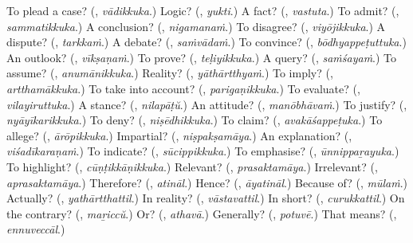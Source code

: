 \begin{tcolorbox}[breakable,colback=teal!4,colframe=teal!35!black,title={Before you move on}]
To plead a case? (\textbf{}, \emph{vādikkuka}.) Logic? (\textbf{}, \emph{yukti}.) A fact? (\textbf{}, \emph{vastuta}.) To admit? (\textbf{}, \emph{sammatikkuka}.) A conclusion? (\textbf{}, \emph{nigamanaṁ}.) To disagree? (\textbf{}, \emph{viyōjikkuka}.) A dispute? (\textbf{}, \emph{tarkkaṁ}.) A debate? (\textbf{}, \emph{saṁvādaṁ}.) To convince? (\textbf{}, \emph{bōdhyappeṭuttuka}.) An outlook? (\textbf{}, \emph{vīkṣaṇaṁ}.) To prove? (\textbf{}, \emph{teḷiyikkuka}.) A query? (\textbf{}, \emph{saṁśayaṁ}.) To assume? (\textbf{}, \emph{anumānikkuka}.) Reality? (\textbf{}, \emph{yāthārtthyaṁ}.) To imply? (\textbf{}, \emph{artthamākkuka}.) To take into account? (\textbf{}, \emph{parigaṇikkuka}.) To evaluate? (\textbf{}, \emph{vilayiruttuka}.) A stance? (\textbf{}, \emph{nilapāṭŭ}.) An attitude? (\textbf{}, \emph{manōbhāvaṁ}.) To justify? (\textbf{}, \emph{nyāyīkarikkuka}.) To deny? (\textbf{}, \emph{niṣēdhikkuka}.) To claim? (\textbf{}, \emph{avakāśappeṭuka}.) To allege? (\textbf{}, \emph{ārōpikkuka}.) Impartial? (\textbf{}, \emph{niṣpakṣamāya}.) An explanation? (\textbf{}, \emph{viśadīkaraṇaṁ}.) To indicate? (\textbf{}, \emph{sūcippikkuka}.) To emphasise? (\textbf{}, \emph{ūnnippaṟayuka}.) To highlight? (\textbf{}, \emph{cūṇṭikkāṇikkuka}.) Relevant? (\textbf{}, \emph{prasaktamāya}.) Irrelevant? (\textbf{}, \emph{aprasaktamāya}.) Therefore? (\textbf{}, \emph{atināl}.) Hence? (\textbf{}, \emph{āyatināl}.) Because of? (\textbf{}, \emph{mūlaṁ}.) Actually? (\textbf{}, \emph{yathārtthattil}.) In reality? (\textbf{}, \emph{vāstavattil}.) In short? (\textbf{}, \emph{curukkattil}.) On the contrary? (\textbf{}, \emph{maṟiccŭ}.) Or? (\textbf{}, \emph{athavā}.) Generally? (\textbf{}, \emph{potuvē}.) That means? (\textbf{}, \emph{ennuveccāl}.)
\end{tcolorbox}

